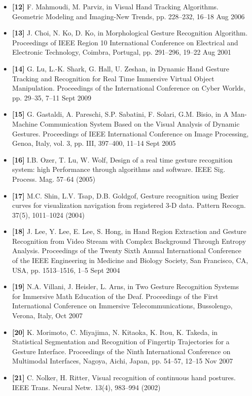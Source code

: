 \documentclass[12pt, a4paper]{article}
\begin{document}
\begin{itemize}[label=]
    \item \textbf{[12]} F. Mahmoudi, M. Parviz, in Visual Hand Tracking Algorithms. Geometric Modeling and Imaging-New Trends, pp. 228–232, 16–18 Aug 2006
    \item \textbf{[13]} J. Choi, N. Ko, D. Ko, in Morphological Gesture Recognition Algorithm. Proceedings of IEEE Region 10 International Conference on Electrical and Electronic Technology, Coimbra, Portugal, pp. 291–296, 19–22 Aug 2001
    \item \textbf{[14]} G. Lu, L.-K. Shark, G. Hall, U. Zeshan, in Dynamic Hand Gesture Tracking and Recognition for Real Time Immersive Virtual Object Manipulation. Proceedings of the International Conference on Cyber Worlds, pp. 29–35, 7–11 Sept 2009
    \item \textbf{[15]} G. Gastaldi, A. Pareschi, S.P. Sabatini, F. Solari, G.M. Bisio, in A Man-Machine Communication System Based on the Visual Analysis of Dynamic Gestures. Proceedings of IEEE International Conference on Image Processing, Genoa, Italy, vol. 3, pp. III, 397–400, 11–14 Sept 2005
    \item \textbf{[16]} I.B. Ozer, T. Lu, W. Wolf, Design of a real time gesture recognition system: high Performance through algorithms and software. IEEE Sig. Process. Mag. 57–64 (2005)
    \item \textbf{[17]} M.C. Shin, L.V. Tsap, D.B. Goldgof, Gesture recognition using Bezier curves for visualization navigation from registered 3-D data. Pattern Recogn. 37(5), 1011–1024 (2004)
    \item \textbf{[18]} J. Lee, Y. Lee, E. Lee, S. Hong, in Hand Region Extraction and Gesture Recognition from Video Stream with Complex Background Through Entropy Analysis. Proceedings of the Twenty Sixth Annual International Conference of the IEEE Engineering in Medicine and Biology Society, San Francisco, CA, USA, pp. 1513–1516, 1–5 Sept 2004
    \item \textbf{[19]} N.A. Villani, J. Heisler, L. Arns, in Two Gesture Recognition Systems for Immersive Math Education of the Deaf. Proceedings of the First International Conference on Immersive Telecommunications, Bussolengo, Verona, Italy, Oct 2007
    \item \textbf{[20]} K. Morimoto, C. Miyajima, N. Kitaoka, K. Itou, K. Takeda, in Statistical Segmentation and Recognition of Fingertip Trajectories for a Gesture Interface. Proceedings of the Ninth International Conference on Multimodal Interfaces, Nagoya, Aichi, Japan, pp. 54–57, 12–15 Nov 2007
    \item \textbf{[21]} C. Nolker, H. Ritter, Visual recognition of continuous hand postures. IEEE Trans. Neural Netw. 13(4), 983–994 (2002)

\end{itemize}
\end{document}
